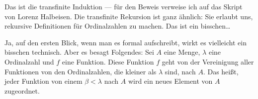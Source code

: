 \begin{math-stroke}
\end{math-stroke}

\begin{spoken-clean}[00:29:30 - 00:30:10]
Das ist die transfinite Induktion --- für den Beweis verweise ich auf das Skript von Lorenz Halbeisen. Die transfinite Rekursion ist ganz ähnlich: Sie erlaubt uns, rekursive Definitionen für Ordinalzahlen zu machen. Das ist ein bisschen\dots
\end{spoken-clean}

\begin{spoken-clean}[00:30:10 - 00:31:41]
Ja, auf den ersten Blick, wenn man es formal aufschreibt, wirkt es vielleicht ein bisschen technisch. Aber es besagt Folgendes: Sei $A$ eine Menge, $\lambda$ eine Ordinalzahl und $f$ eine Funktion. Diese Funktion $f$ geht von der Vereinigung aller Funktionen von den Ordinalzahlen, die kleiner als $\lambda$ sind, nach $A$. Das heißt, jeder Funktion von einem $\beta < \lambda$ nach $A$ wird ein neues Element von $A$ zugeordnet.
\end{spoken-clean}

\begin{math-stroke}
\end{math-stroke}

